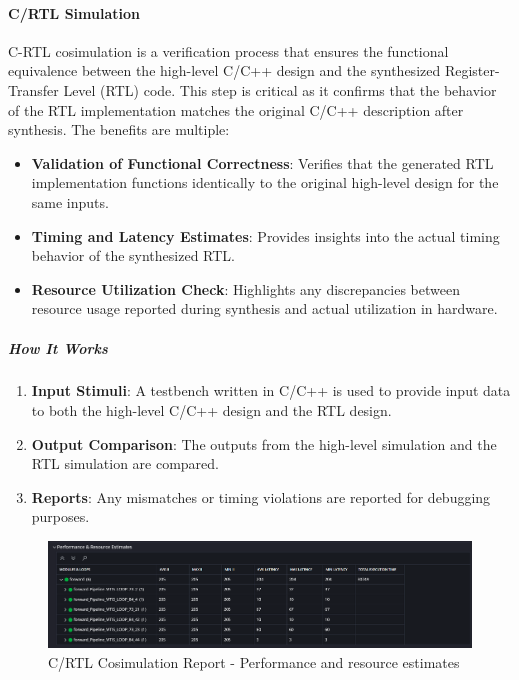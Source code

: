 \documentclass{article}
\begin{document}
\paragraph{C/RTL Simulation}

C-RTL cosimulation is a verification process that ensures the functional equivalence between the high-level C/C++ design and the synthesized Register-Transfer Level (RTL) code. This step is critical as it confirms that the behavior of the RTL implementation matches the original C/C++ description after synthesis. The benefits are multiple:

\begin{itemize}
    \item \textbf{Validation of Functional Correctness}: Verifies that the generated RTL implementation functions identically to the original high-level design for the same inputs.
    \item \textbf{Timing and Latency Estimates}: Provides insights into the actual timing behavior of the synthesized RTL.
    \item \textbf{Resource Utilization Check}: Highlights any discrepancies between resource usage reported during synthesis and actual utilization in hardware.
\end{itemize}

\subparagraph{How It Works}
\begin{enumerate}
    \item \textbf{Input Stimuli}: A testbench written in C/C++ is used to provide input data to both the high-level C/C++ design and the RTL design.
    \item \textbf{Output Comparison}: The outputs from the high-level simulation and the RTL simulation are compared.
    \item \textbf{Reports}: Any mismatches or timing violations are reported for debugging purposes.
\end{enumerate}


\begin{figure}[H]
    \centering
    \includegraphics[width=1\textwidth]{./assets/MLP/c-rtl-cosimulation.png}
    \caption{C/RTL Cosimulation Report - Performance and resource estimates}
    \label{fig:C-RTL-cosimulation-mlp}
\end{figure}
\end{document}
